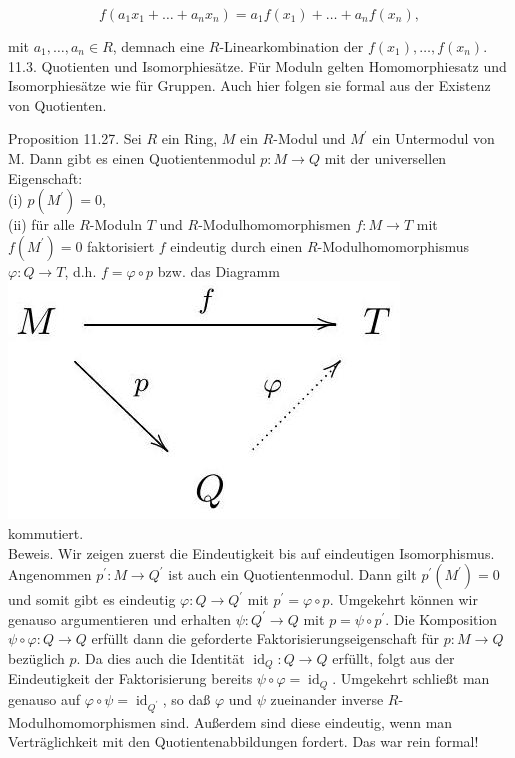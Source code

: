 \documentclass[10pt, letterpaper]{article}
\begin{document}
$$
f\left(a_{1} x_{1}+\ldots+a_{n} x_{n}\right)=a_{1} f\left(x_{1}\right)+\ldots+a_{n} f\left(x_{n}\right),
$$

mit $a_{1}, \ldots, a_{n} \in R$, demnach eine $R$-Linearkombination der $f\left(x_{1}\right), \ldots, f\left(x_{n}\right)$.\\
11.3. Quotienten und Isomorphiesätze. Für Moduln gelten Homomorphiesatz und Isomorphiesätze wie für Gruppen. Auch hier folgen sie formal aus der Existenz von Quotienten.

Proposition 11.27. Sei $R$ ein Ring, $M$ ein $R$-Modul und $M^{\prime}$ ein Untermodul von M. Dann gibt es einen Quotientenmodul $p: M \rightarrow Q$ mit der universellen Eigenschaft:\\
(i) $p\left(M^{\prime}\right)=0$,\\
(ii) für alle $R$-Moduln $T$ und $R$-Modulhomomorphismen $f: M \rightarrow T$ mit $f\left(M^{\prime}\right)=0$ faktorisiert $f$ eindeutig durch einen $R$-Modulhomomorphismus $\varphi: Q \rightarrow T$, d.h. $f=\varphi \circ p$ bzw. das Diagramm\\
\includegraphics[max width=\textwidth, center]{2025_06_13_6ba93caed1e95a95104eg-092}\\
kommutiert.\\
Beweis. Wir zeigen zuerst die Eindeutigkeit bis auf eindeutigen Isomorphismus. Angenommen $p^{\prime}: M \rightarrow Q^{\prime}$ ist auch ein Quotientenmodul. Dann gilt $p^{\prime}\left(M^{\prime}\right)=0$ und somit gibt es eindeutig $\varphi: Q \rightarrow Q^{\prime}$ mit $p^{\prime}=\varphi \circ p$. Umgekehrt können wir genauso argumentieren und erhalten $\psi: Q^{\prime} \rightarrow Q$ mit $p=\psi \circ p^{\prime}$. Die Komposition $\psi \circ \varphi: Q \rightarrow Q$ erfüllt dann die geforderte Faktorisierungseigenschaft für $p: M \rightarrow Q$ bezüglich $p$. Da dies auch die Identität $\operatorname{id}_{Q}: Q \rightarrow Q$ erfüllt, folgt aus der Eindeutigkeit der Faktorisierung bereits $\psi \circ \varphi=\operatorname{id}_{Q}$. Umgekehrt schließt man genauso auf $\varphi \circ \psi=\operatorname{id}_{Q^{\prime}}$, so daß $\varphi$ und $\psi$ zueinander inverse $R$-Modulhomomorphismen sind. Außerdem sind diese eindeutig, wenn man Verträglichkeit mit den Quotientenabbildungen fordert. Das war rein formal!
\end{document}
